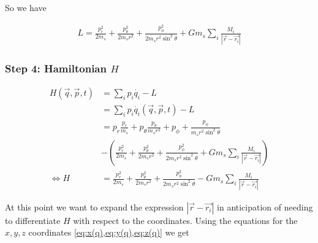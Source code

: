 So we have

\begin{align}
    L = \frac{p_r^2}{2 m_s} + \frac{p_\theta^2}{2 m_s r^2} + \frac{p_\phi^2}{2 m_s r^2 \sin^2{\theta}} + G m_s \sum\limits_{i} \frac{M_i}{\left| \vec{r} - \vec{r_i} \right|}
\end{align}

\subsubsection{Step 4: Hamiltonian \(H\)}
\begin{align}
    H(\vec{q}, \vec{p}, t) &= \sum\limits_{i}p_i \dot{q_i} - L \\
    &= \sum\limits_{i}p_i \dot{q_i}(\vec{q}, \vec{p}, t) - L \\
    &= p_r \frac{p_r}{m_s} + p_\theta \frac{p_\theta}{m_s r^2} + p_\phi + \frac{p_\phi}{m_s r^2 \sin^2{\theta}} \nonumber \\
    &- \left( \frac{p_r^2}{2 m_s} + \frac{p_\theta^2}{2 m_s r^2} + \frac{p_\phi^2}{2 m_s r^2 \sin^2{\theta}} + G m_s \sum\limits_{i} \frac{M_i}{\left| \vec{r} - \vec{r_i} \right|} \right) \\
    \Leftrightarrow H &= \frac{p_r^2}{2 m_s} + \frac{p_\theta^2}{2 m_s r^2} + \frac{p_\phi^2}{2 m_s r^2 \sin^2{\theta}} - G m_s \sum\limits_{i} \frac{M_i}{\left| \vec{r} - \vec{r_i} \right|}
\end{align}

At this point we want to expand the expression \(\left| \vec{r} - \vec{r_i} \right|\) in anticipation of needing to differentiate \(H\) with respect to the coordinates. Using the equations for the \(x, y, z\) coordinates \cref{eq:x(q),eq:y(q),eq:z(q)} we get

